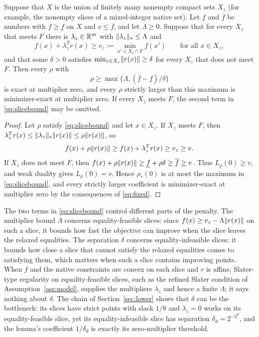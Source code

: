 \begin{lemma}\label{lem:slices}
Suppose that $X$ is the union of finitely many nonempty compact sets
$X_z$ (for example, the nonempty slices of a mixed-integer native set).
Let $\underline f$ and $\overline f$ be numbers with
$f\ge\underline f$ on $X$ and $v\le\overline f$, and let $\Lambda\ge0$.
Suppose that for every $X_z$ that meets $F$ there is
$\lambda_z\in\mathbb R^m$ with $\lVert\lambda_z\rVert_*\le\Lambda$ and
\[
 f(x)+\lambda_z^Tr(x)\ge v_z:=\min_{x'\in X_z\cap F}f(x')
 \qquad\text{for all }x\in X_z ,
\]
and that some $\delta>0$ satisfies $\min_{x\in X_z}\lVert r(x)\rVert\ge\delta$
for every $X_z$ that does not meet $F$. Then every $\rho$ with
\begin{equation}\label{eq:slicebound}
 \rho\ge\max\{\Lambda,(\overline f-\underline f)/\delta\}
\end{equation}
is exact at multiplier zero, and every $\rho$ strictly larger than this
maximum is minimizer-exact at multiplier zero. If every $X_z$ meets
$F$, the second term in \eqref{eq:slicebound} may be omitted.
\end{lemma}
\begin{proof}
Let $\rho$ satisfy \eqref{eq:slicebound} and let $x\in X_z$. If $X_z$
meets $F$, then $\lambda_z^Tr(x)\le\lVert\lambda_z\rVert_*\lVert r(x)\rVert\le
\rho\lVert r(x)\rVert$, so
\[
 f(x)+\rho\lVert r(x)\rVert\ge f(x)+\lambda_z^Tr(x)\ge v_z\ge v .
\]
If $X_z$ does not meet $F$, then
$f(x)+\rho\lVert r(x)\rVert\ge\underline f+\rho\delta\ge\overline f\ge v$.
Thus $L_\rho(0)\ge v$, and weak duality gives $L_\rho(0)=v$. Hence
$\rho_*(0)$ is at most the maximum in \eqref{eq:slicebound}, and every
strictly larger coefficient is minimizer-exact at multiplier zero by the
consequences of \eqref{eq:fixed}.
\end{proof}
The two terms in \eqref{eq:slicebound} control different parts of the
penalty. The multiplier bound $\Lambda$ concerns equality-feasible
slices: since $f(x)\ge v_z-\Lambda\lVert r(x)\rVert$ on such a slice, it
bounds how fast the objective can improve when the slice leaves the
relaxed equalities. The separation $\delta$ concerns
equality-infeasible slices: it bounds how close a slice that cannot
satisfy the relaxed equalities comes to satisfying them, which matters
when such a slice contains improving points. When $f$ and the native
constraints are convex on each slice and $r$ is affine, Slater-type
regularity on equality-feasible slices, such as the refined
Slater condition of Assumption~\ref{ass:model}, supplies the
multipliers $\lambda_z$ and hence a finite $\Lambda$; it says nothing
about $\delta$. The chain of Section~\ref{sec:lower} shows that
$\delta$ can be the bottleneck: its slices have strict points with slack
$1/8$ and $\lambda_z=0$ works on its equality-feasible slice, yet its
equality-infeasible slice has separation $\delta_d=2^{-2^d}$, and the
lemma's coefficient $1/\delta_d$ is exactly its zero-multiplier
threshold.
